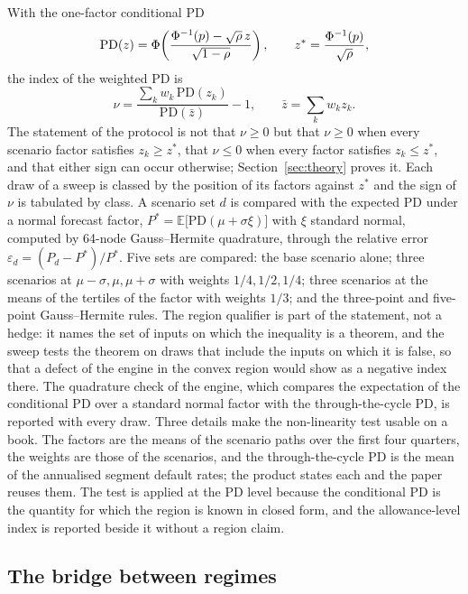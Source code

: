 With the one-factor conditional PD
\begin{equation}
\mathrm{PD}(z)=\Phi\!\left(\frac{\Phi^{-1}(p)-\sqrt{\rho}\,z}{\sqrt{1-\rho}}\right),\qquad z^{*}=\frac{\Phi^{-1}(p)}{\sqrt{\rho}},
\label{eq:pd}
\end{equation}
the index of the weighted PD is
\begin{equation}
\nu=\frac{\sum_k w_k\,\mathrm{PD}(z_k)}{\mathrm{PD}(\bar z)}-1,\qquad \bar z=\sum_k w_kz_k.
\label{eq:index}
\end{equation}
The statement of the protocol is not that $\nu\ge0$ but that $\nu\ge0$ when every scenario factor satisfies $z_k\ge z^{*}$, that $\nu\le0$ when every factor satisfies $z_k\le z^{*}$, and that either sign can occur otherwise; Section~\ref{sec:theory} proves it.
Each draw of a sweep is classed by the position of its factors against $z^{*}$ and the sign of $\nu$ is tabulated by class.
A scenario set $d$ is compared with the expected PD under a normal forecast factor, $P^{*}=\mathbb{E}\big[\mathrm{PD}(\mu+\sigma\xi)\big]$ with $\xi$ standard normal, computed by 64-node Gauss--Hermite quadrature, through the relative error $\varepsilon_d=(P_d-P^{*})/P^{*}$.
Five sets are compared: the base scenario alone; three scenarios at $\mu-\sigma,\mu,\mu+\sigma$ with weights $1/4,1/2,1/4$; three scenarios at the means of the tertiles of the factor with weights $1/3$; and the three-point and five-point Gauss--Hermite rules.
The region qualifier is part of the statement, not a hedge: it names the set of inputs on which the inequality is a theorem, and the sweep tests the theorem on draws that include the inputs on which it is false, so that a defect of the engine in the convex region would show as a negative index there.
The quadrature check of the engine, which compares the expectation of the conditional PD over a standard normal factor with the through-the-cycle PD, is reported with every draw.
Three details make the non-linearity test usable on a book.
The factors are the means of the scenario paths over the first four quarters, the weights are those of the scenarios, and the through-the-cycle PD is the mean of the annualised segment default rates; the product states each and the paper reuses them.
The test is applied at the PD level because the conditional PD is the quantity for which the region is known in closed form, and the allowance-level index is reported beside it without a region claim.

\subsection{The bridge between regimes}
\label{sec:method-bridge}

